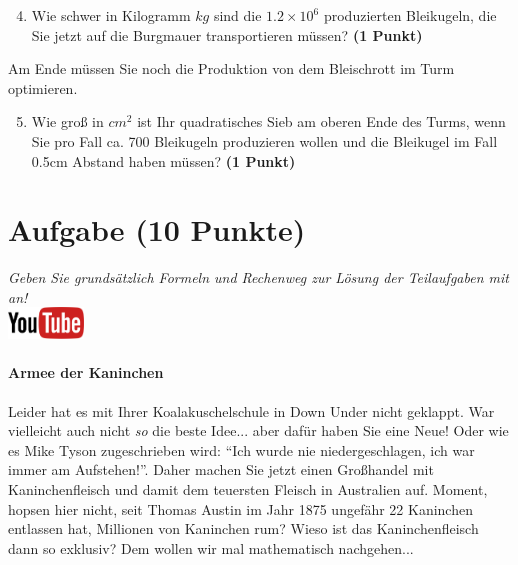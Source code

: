 \documentclass[a4paper, 10pt]{scrartcl}\usepackage[]{graphicx}\usepackage[]{xcolor}
\begin{document}
\begin{enumerate}
  \setcounter{enumi}{3}
\item Wie schwer in Kilogramm $kg$ sind die \ensuremath{1.2\times 10^{6}} produzierten
  Bleikugeln, die Sie jetzt auf die Burgmauer transportieren m{\"u}ssen?
  \textbf{(1 Punkt)}
\end{enumerate}

Am Ende m{\"u}ssen Sie noch die Produktion von dem Bleischrott im Turm optimieren.

\begin{enumerate}
  \setcounter{enumi}{4}
\item Wie gro{\ss} in $cm^2$ ist Ihr quadratisches Sieb am oberen Ende des Turms,
  wenn Sie pro Fall ca. 700 Bleikugeln produzieren wollen und
  die Bleikugel im Fall 0.5cm Abstand haben m{\"u}ssen?  \textbf{(1
    Punkt)}
\end{enumerate}
 
\clearpage

\section{Aufgabe \hfill (10 Punkte)}

\textit{Geben Sie grunds{\"a}tzlich Formeln und Rechenweg zur L{\"o}sung der
  Teilaufgaben mit an!} \\[1Ex]

\hfill\href{https://youtu.be/iErlRMwQ2RE}{\includegraphics[width =
  2cm]{img/youtube}} %
\hspace{2Ex}

\paragraph{Armee der Kaninchen}



Leider hat es mit Ihrer Koalakuschelschule in Down Under nicht geklappt. War vielleicht
auch nicht \textit{so} die beste Idee... aber daf{\"u}r haben Sie eine Neue!
Oder wie es Mike Tyson zugeschrieben wird: "`Ich wurde nie
niedergeschlagen, ich war immer am Aufstehen!"'. Daher machen Sie jetzt
einen Gro{\ss}handel mit Kaninchenfleisch und damit dem teuersten Fleisch in
Australien auf. Moment, hopsen hier nicht, seit Thomas Austin im Jahr
1875 ungef{\"a}hr 22 Kaninchen entlassen hat, Millionen
von Kaninchen rum? Wieso ist das Kaninchenfleisch dann so exklusiv? Dem
wollen wir mal mathematisch nachgehen... \\
\end{document}
